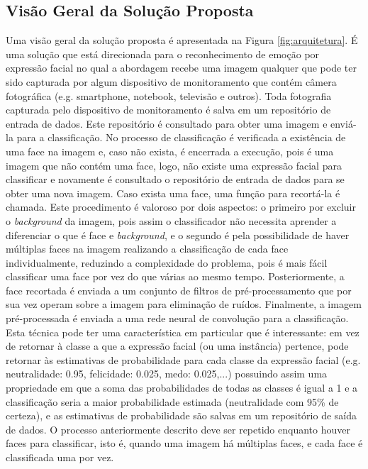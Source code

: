 \subsection{Visão Geral da Solução Proposta}
Uma visão geral da solução proposta é apresentada na Figura \ref{fig:arquitetura}. É uma solução que está direcionada para o reconhecimento de emoção por expressão facial no qual a abordagem recebe uma imagem qualquer que pode ter sido capturada por algum dispositivo de monitoramento que contém câmera fotográfica (e.g. smartphone, notebook, televisão e outros). Toda  fotografia capturada pelo dispositivo de monitoramento é salva em um repositório de entrada de dados. Este repositório é consultado para obter uma imagem e enviá-la para a classificação. No processo de classificação é verificada a existência de uma face na imagem e, caso não exista, é encerrada a execução, pois é uma imagem que não contém uma face, logo, não existe uma expressão facial para classificar e novamente é consultado o repositório de entrada de dados para se obter uma nova imagem. Caso exista uma face, uma função para recortá-la é chamada. Este procedimento é valoroso por dois aspectos: o primeiro por excluir o \textit{background} da imagem, pois assim o classificador não necessita aprender a diferenciar o que é face e \textit{background}, e o segundo é pela possibilidade de haver múltiplas faces na imagem realizando a classificação de cada face individualmente, reduzindo a complexidade do problema, pois é mais fácil classificar uma face por vez do que várias ao mesmo tempo. Posteriormente, a face recortada é enviada a um conjunto de filtros de pré-processamento que por sua vez operam sobre a imagem para eliminação de ruídos. Finalmente, a imagem pré-processada é enviada a uma rede neural de convolução para a classificação. Esta técnica pode ter uma característica em particular que é interessante: em vez de retornar à classe a que a expressão facial (ou uma instância) pertence, pode retornar às estimativas de probabilidade para cada classe da expressão facial (e.g. neutralidade: 0.95, felicidade: 0.025, medo: 0.025,...) possuindo assim uma propriedade em que a soma das probabilidades de todas as classes é igual a 1 e a classificação seria a maior probabilidade estimada (neutralidade com 95\% de certeza), e as estimativas de probabilidade são salvas em um repositório de saída de dados. O processo anteriormente descrito deve ser repetido enquanto houver faces para classificar, isto é, quando uma imagem há múltiplas faces, e cada face é classificada uma por vez.

